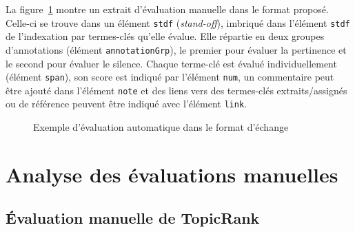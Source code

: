         La figure~\ref{fig:tei_tbx_evaluation_example} montre un extrait
        d'évaluation manuelle dans le format proposé. Celle-ci se trouve dans un
        élément \texttt{stdf} (\textit{stand-off}), imbriqué dans l'élément
        \texttt{stdf} de l'indexation par termes-clés qu'elle évalue. Elle
        répartie en deux groupes d'annotations (élément
        \texttt{annotationGrp}), le premier pour évaluer la pertinence et le
        second pour évaluer le silence. Chaque terme-clé est évalué
        individuellement (élément \texttt{span}), son score est indiqué par
        l'élément \texttt{num}, un commentaire peut être ajouté dans l'élément
        \texttt{note} et des liens vers des termes-clés extraits/assignés ou de
        référence peuvent être indiqué avec l'élément \texttt{link}.
        \begin{figure}[h!]
          \lstset{language=XML}
          \lstset{frame=single}
          
          \caption{Exemple d'évaluation automatique dans le format d'échange
                   \label{fig:tei_tbx_evaluation_example}}
        \end{figure}


  \section{Analyse des évaluations manuelles}
  \label{sec:main-automatic_evaluation_of_keyphrase_annotation-results}
    
    \subsection{Évaluation manuelle de TopicRank}
    \label{subsec:main-automatic_evaluation_of_keyphrase_annotation-results-topicrank}
    
